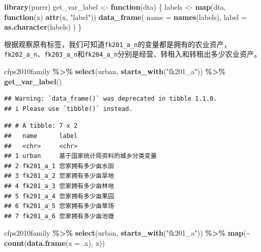\documentclass[
  oneside]{book}
\newenvironment{Shaded}{\begin{snugshade}}{\end{snugshade}}
\newcommand{\AttributeTok}[1]{\textcolor[rgb]{0.13,0.29,0.53}{#1}}
\newcommand{\ControlFlowTok}[1]{\textcolor[rgb]{0.13,0.29,0.53}{\textbf{#1}}}
\newcommand{\FunctionTok}[1]{\textcolor[rgb]{0.13,0.29,0.53}{\textbf{#1}}}
\newcommand{\NormalTok}[1]{#1}
\newcommand{\OtherTok}[1]{\textcolor[rgb]{0.56,0.35,0.01}{#1}}
\newcommand{\SpecialCharTok}[1]{\textcolor[rgb]{0.81,0.36,0.00}{\textbf{#1}}}
\newcommand{\StringTok}[1]{\textcolor[rgb]{0.31,0.60,0.02}{#1}}
\begin{document}
\begin{Shaded}
\begin{Highlighting}[]
\FunctionTok{library}\NormalTok{(purrr)}
\NormalTok{get\_var\_label }\OtherTok{\textless{}{-}} \ControlFlowTok{function}\NormalTok{(dta) \{}
\NormalTok{  labels }\OtherTok{\textless{}{-}} \FunctionTok{map}\NormalTok{(dta, }\ControlFlowTok{function}\NormalTok{(x) }\FunctionTok{attr}\NormalTok{(x, }\StringTok{"label"}\NormalTok{))}
  \FunctionTok{data\_frame}\NormalTok{(}
    \AttributeTok{name =} \FunctionTok{names}\NormalTok{(labels),}
    \AttributeTok{label =} \FunctionTok{as.character}\NormalTok{(labels)}
\NormalTok{  )}
\NormalTok{\}}
\end{Highlighting}
\end{Shaded}

根据观察原有标签，我们可知道\texttt{fk201\_a\_n}的变量都是拥有的农业资产，\texttt{fk202\_a\_n}、\texttt{fk203\_a\_n}和\texttt{fk204\_a\_n}分别是经营、转租入和转租出多少农业资产。

\begin{Shaded}
\begin{Highlighting}[]
\NormalTok{cfps2010family }\SpecialCharTok{\%\textgreater{}\%}
  \FunctionTok{select}\NormalTok{(urban, }\FunctionTok{starts\_with}\NormalTok{(}\StringTok{"fk201\_a"}\NormalTok{)) }\SpecialCharTok{\%\textgreater{}\%}
  \FunctionTok{get\_var\_label}\NormalTok{()}
\end{Highlighting}
\end{Shaded}

\begin{verbatim}
## Warning: `data_frame()` was deprecated in tibble 1.1.0.
## i Please use `tibble()` instead.
\end{verbatim}

\begin{verbatim}
## # A tibble: 7 x 2
##   name      label                           
##   <chr>     <chr>                           
## 1 urban     基于国家统计局资料的城乡分类变量
## 2 fk201_a_1 您家拥有多少亩水田              
## 3 fk201_a_2 您家拥有多少亩旱地              
## 4 fk201_a_3 您家拥有多少亩林地              
## 5 fk201_a_4 您家拥有多少亩果园              
## 6 fk201_a_5 您家拥有多少亩草场              
## 7 fk201_a_6 您家拥有多少亩池塘
\end{verbatim}

\begin{Shaded}
\begin{Highlighting}[]
\NormalTok{cfps2010family }\SpecialCharTok{\%\textgreater{}\%}
  \FunctionTok{select}\NormalTok{(urban, }\FunctionTok{starts\_with}\NormalTok{(}\StringTok{"fk201\_a"}\NormalTok{)) }\SpecialCharTok{\%\textgreater{}\%}
  \FunctionTok{map}\NormalTok{(}\SpecialCharTok{\textasciitilde{}} \FunctionTok{count}\NormalTok{(}\FunctionTok{data.frame}\NormalTok{(}\AttributeTok{x =}\NormalTok{ .x), x))}
\end{Highlighting}
\end{Shaded}
\end{document}
